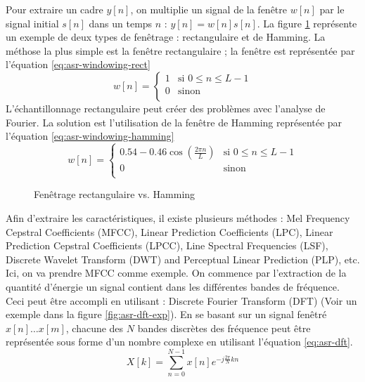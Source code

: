 \documentclass{KodeBook}
\begin{document}
Pour extraire un cadre $y[n]$, on multiplie un signal de la fenêtre $w[n]$ par le signal initial $s[n]$ dans un temps $n$ : $ y[n] = w[n] s[n] $. 
La figure \ref{fig:asr-windowing-rect-hamm} représente un exemple de deux types de fenêtrage : rectangulaire et de Hamming. 
La méthose la plus simple est la fenêtre rectangulaire ; la fenêtre est représentée par l'équation \ref{eq:asr-windowing-rect}
\begin{equation}\label{eq:asr-windowing-rect}
w[n] = \begin{cases}
1 & \text{si } 0 \le n \le L-1 \\
0 & \text{sinon }\\
\end{cases}
\end{equation}
L'échantillonnage rectangulaire peut créer des problèmes avec l'analyse de Fourier. 
La solution est l'utilisation de la fenêtre de Hamming représentée par l'équation \ref{eq:asr-windowing-hamming}
\begin{equation}\label{eq:asr-windowing-hamming}
w[n] = \begin{cases}
0.54 - 0.46 \cos (\frac{2\pi n}{L}) & \text{si } 0 \le n \le L-1 \\
0 & \text{sinon }\\
\end{cases}
\end{equation}

\begin{figure}[!ht]
	\centering
	\caption{Fenêtrage rectangulaire vs. Hamming \cite{2020-jurafsky-martin}}
	\label{fig:asr-windowing-rect-hamm}
\end{figure}

Afin d'extraire les caractéristiques, il existe plusieurs méthodes : Mel Frequency Cepstral Coefficients (MFCC), Linear Prediction Coefficients (LPC), Linear Prediction Cepstral Coefficients (LPCC), Line Spectral Frequencies (LSF), Discrete Wavelet Transform (DWT) and Perceptual Linear Prediction (PLP), etc. 
Ici, on va prendre MFCC comme exemple.
On commence par l'extraction de la quantité d'énergie un signal contient dans les différentes bandes de fréquence. 
Ceci peut être accompli en utilisant : Discrete Fourier Transform (DFT) (Voir un exemple dans la figure \ref{fig:asr-dft-exp}).
En se basant sur un signal fenêtré $x[n] \ldots x[m]$, chacune des $N$ bandes discrètes des fréquence peut être représentée sous forme d'un nombre complexe en utilisant l'équation \ref{eq:asr-dft}.
\begin{equation}\label{eq:asr-dft}
X[k] = \sum\limits_{n=0}^{N-1} x[n] e^{-j\frac{2\pi}{N} k n}
\end{equation}
\end{document}
